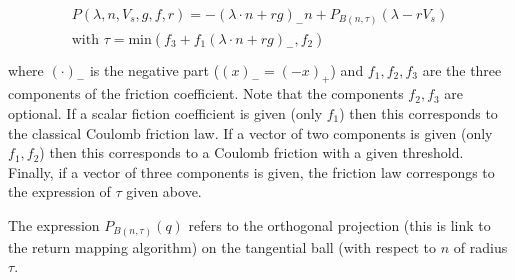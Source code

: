 \documentclass[a4paper,11pt,english]{sphinxmanual}
\begin{document}
\begin{itemize}
\begin{align*}
\begin{aligned}
P(\lambda, n, V_s, g, f, r) = -(\lambda\cdot n + rg)_- n + P_{B(n,\tau)}(\lambda - rV_s)\\
\mbox{with } \tau = \mbox{min}(f_3 + f_1(\lambda\cdot n + rg)_-, f_2)\\
\end{aligned}\end{align*}
where \((\cdot)_-\) is the negative part (\((x)_- = (-x)_+\)) and \(f_1, f_2, f_3\) are the three components of the friction coefficient. Note that the components \(f_2, f_3\) are optional. If a scalar fiction coefficient is given (only \(f_1\)) then this corresponds to the classical Coulomb friction law. If a vector of two components is given  (only \(f_1, f_2\)) then this corresponds to a Coulomb friction with a given threshold. Finally, if a vector of three components is given, the friction law correspongs to the expression of \(\tau\) given above.

The expression \(P_{B(n,\tau)}(q)\) refers to the orthogonal projection (this is link to the return mapping algorithm) on the tangential ball (with respect to \(n\) of radius \(\tau\).


\end{itemize}
\end{document}
